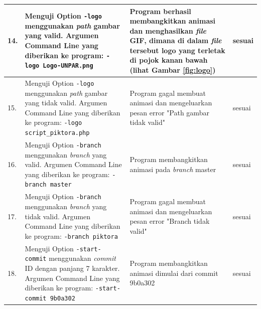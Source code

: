 \begin{table}[htbp]
\begin{tabular}{|p{0.3cm}|>{\raggedright} p{7 cm}| p{5.5 cm}| p{3 cm}|}
		14. & Menguji Option \texttt{-logo} menggunakan \textit{path} gambar yang valid. Argumen Command Line yang diberikan ke program: \texttt{-logo Logo-UNPAR.png} & Program berhasil membangkitkan animasi dan menghasilkan \textit{file} GIF, dimana di dalam \textit{file} tersebut logo yang terletak di pojok kanan bawah (lihat Gambar \ref{fig:logo}) & sesuai  \\ \hline
		15. & Menguji Option \texttt{-logo} menggunakan \textit{path} gambar yang tidak valid. Argumen Command Line yang diberikan ke program: \texttt{-logo script\_piktora.php} & Program gagal membuat animasi dan mengeluarkan pesan error "Path gambar tidak valid" & sesuai  \\ \hline
		16. & Menguji Option \texttt{-branch} menggunakan \textit{branch} yang valid. Argumen Command Line yang diberikan ke program: \texttt{-branch master} & Program membangkitkan animasi pada \textit{branch} master & sesuai  \\ \hline
		17. & Menguji Option \texttt{-branch} menggunakan \textit{branch} yang tidak valid. Argumen Command Line yang diberikan ke program: \texttt{-branch piktora}  & Program gagal membuat animasi dan mengeluarkan pesan error "Branch tidak valid" & sesuai  \\ \hline
		18. & Menguji Option \texttt{-start-commit} menggunakan \textit{commit} ID dengan panjang 7 karakter. Argumen Command Line yang diberikan ke program:  \texttt{-start-commit 9b0a302} & Program membangkitkan animasi dimulai dari commit 9b0a302 & sesuai  \\ \hline		
		
		
\end{tabular}
	\label{table:hasil_pengujian2}
\end{table}


